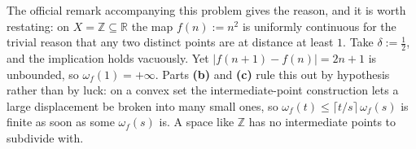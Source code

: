 \begin{exercisesolution}
\begin{remark}
The official remark accompanying this problem gives the reason, and it is worth restating: on
$X = \mathbb{Z} \subseteq \mathbb{R}$ the map $f(n) := n^2$ is uniformly continuous for the
trivial reason that any two distinct points are at distance at least $1$. Take
$\delta := \tfrac12$, and the implication holds vacuously. Yet
$|f(n+1)-f(n)| = 2n+1$ is unbounded, so $\omega_f(1) = +\infty$. Parts \textbf{(b)} and
\textbf{(c)} rule this out by
hypothesis rather than by luck: on a convex set the intermediate-point construction lets a large
displacement be broken into many small ones, so $\omega_f(t) \leq \lceil t/s\rceil\,\omega_f(s)$
is finite as soon as some $\omega_f(s)$ is. A space like $\mathbb{Z}$ has no intermediate points
to subdivide with.
\end{remark}
\end{exercisesolution}
